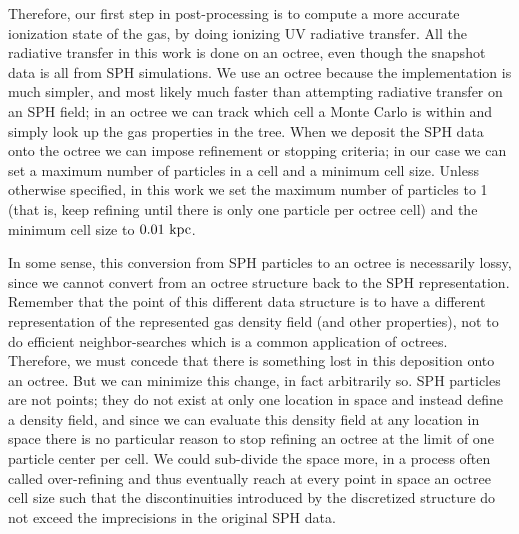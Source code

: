 Therefore, our first step in post-processing is to compute a more accurate ionization state of the gas, by doing ionizing UV radiative transfer.
All the radiative transfer in this work is done on an octree, even though the snapshot data is all from SPH simulations.
We use an octree because the implementation is much simpler, and most likely much faster than attempting radiative transfer on an SPH field; in an octree we can track which cell a Monte Carlo is within and simply look up the gas properties in the tree.
When we deposit the SPH data onto the octree we can impose refinement or stopping criteria; in our case we can set a maximum number of particles in a cell and a minimum cell size.
Unless otherwise specified, in this work we set the maximum number of particles to 1 (that is, keep refining until there is only one particle per octree cell) and the minimum cell size to $0.01\ \rm{kpc}$.

In some sense, this conversion from SPH particles to an octree is necessarily lossy, since we cannot convert from an octree structure back to the SPH representation.
Remember that the point of this different data structure is to have a different representation of the represented gas density field (and other properties), not to do efficient neighbor-searches which is a common application of octrees.
Therefore, we must concede that there is something lost in this deposition onto an octree.
But we can minimize this change, in fact arbitrarily so.
SPH particles are not points; they do not exist at only one location in space and instead define a density field, and since we can evaluate this density field at any location in space there is no particular reason to stop refining an octree at the limit of one particle center per cell.
We could sub-divide the space more, in a process often called over-refining and thus eventually reach at every point in space an octree cell size such that the discontinuities introduced by the discretized structure do not exceed the imprecisions in the original SPH data.

